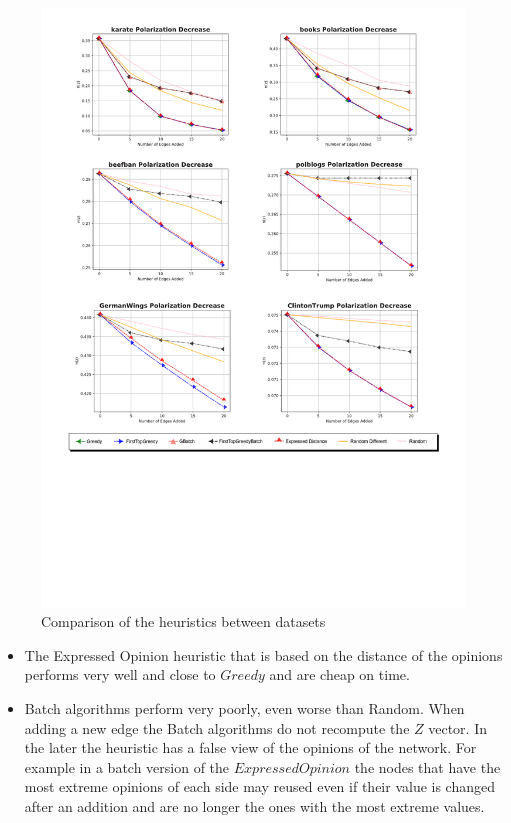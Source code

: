 \begin{figure}[!htbp]
	\begin{center}
	\advance\leftskip-1.3cm
	\captionsetup{justification=centering,margin=2cm}
	\includegraphics[width=1.2\textwidth]{Figures/heuristics}
	\caption{Comparison of the heuristics between datasets}
	\label{fig:heuristics_small}
	\end{center}
\end{figure}
\clearpage

\begin{itemize}
  \item The Expressed Opinion heuristic that is based on the distance of the opinions performs very well and close to $Greedy$ and are cheap on time.
  \item Batch algorithms perform very poorly, even worse than Random. When adding a new edge the Batch algorithms do not recompute the $Z$ vector. In the later the heuristic has a false view of the opinions of the network. For example in a batch version of the $ExpressedOpinion$ the nodes that have the most extreme opinions of each side may reused even if their value is changed after an addition and are no longer the ones with the most extreme values.
 \end{itemize}
 
